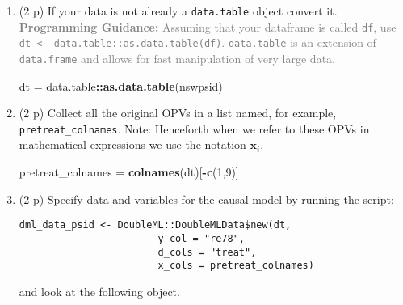 \documentclass[
]{article}
\newenvironment{Shaded}{\begin{snugshade}}{\end{snugshade}}
\newcommand{\AttributeTok}[1]{\textcolor[rgb]{0.13,0.29,0.53}{#1}}
\newcommand{\DecValTok}[1]{\textcolor[rgb]{0.00,0.00,0.81}{#1}}
\newcommand{\FunctionTok}[1]{\textcolor[rgb]{0.13,0.29,0.53}{\textbf{#1}}}
\newcommand{\NormalTok}[1]{#1}
\newcommand{\OtherTok}[1]{\textcolor[rgb]{0.56,0.35,0.01}{#1}}
\newcommand{\SpecialCharTok}[1]{\textcolor[rgb]{0.81,0.36,0.00}{\textbf{#1}}}
\newcommand{\StringTok}[1]{\textcolor[rgb]{0.31,0.60,0.02}{#1}}
\begin{document}
\begin{enumerate}
  \begin{enumerate}
  \def\labelenumii{\alph{enumii}.}
  \setcounter{enumii}{1}
  \item
    (2 p) If your data is not already a \texttt{data.table} object
    convert it.
    \textcolor{gray}{\textbf{Programming Guidance:} Assuming that your dataframe is called \texttt{df}, use \texttt{dt <- data.table::as.data.table(df)}. \texttt{data.table} is an extension of \texttt{data.frame} and allows for fast manipulation of very large data.}

\begin{Shaded}
\begin{Highlighting}[]
\NormalTok{dt }\OtherTok{=}\NormalTok{ data.table}\SpecialCharTok{::}\FunctionTok{as.data.table}\NormalTok{(nswpsid)}
\end{Highlighting}
\end{Shaded}
  \item
    (2 p) Collect all the original OPVs in a list named, for example,
    \texttt{pretreat\_colnames}. Note: Henceforth when we refer to these
    OPVs in mathematical expressions we use the notation
    \(\mathbf{x}_{i}\).

\begin{Shaded}
\begin{Highlighting}[]
\NormalTok{pretreat\_colnames }\OtherTok{=} \FunctionTok{colnames}\NormalTok{(dt)[}\SpecialCharTok{{-}}\FunctionTok{c}\NormalTok{(}\DecValTok{1}\NormalTok{,}\DecValTok{9}\NormalTok{)] }
\end{Highlighting}
\end{Shaded}
  \item
    (2 p) Specify data and variables for the causal model by running the
    script:\label{item:dml-data}

\begin{verbatim}
dml_data_psid <- DoubleML::DoubleMLData$new(dt,
                        y_col = "re78",
                        d_cols = "treat",
                        x_cols = pretreat_colnames)
\end{verbatim}

    and look at the following object.

\begin{Shaded}
\end{Shaded}


\end{enumerate}
\end{enumerate}
\end{document}
